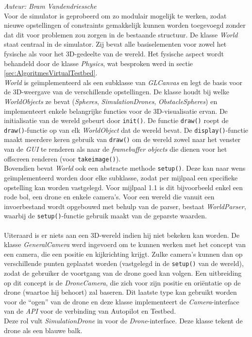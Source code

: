 {\em Auteur: Bram Vandendriessche}
\\

\noindent
Voor de simulator is geprobeerd om zo modulair mogelijk te werken, zodat nieuwe opstellingen of constraints gemakkelijk kunnen worden toegevoegd zonder dat dit voor problemen zou zorgen in de bestaande structuur. De klasse \textit{World} staat centraal in de simulator. Zij bevat alle basiselementen voor zowel het fysische als voor het 3D-gedeelte van de wereld. Het fysische aspect wordt behandeld door de klasse \textit{Physics}, wat besproken werd in sectie \ref{sec:AlgoritmesVirtualTestbed}. 
\\

\noindent
\textit{World} is ge\"implementeerd als een subklasse van \textit{GLCanvas} en legt de basis voor de 3D-weergave van de verschillende opstellingen. 
De klasse houdt bij welke \textit{WorldObjects} ze bevat (\textit{Spheres}, \textit{SimulationDrones}, \textit{ObstacleSpheres}) en implementeert enkele belangrijke functies voor de 3D-visualisatie ervan. De initialisatie van de wereld gebeurt door \texttt{init()}. De functie \texttt{draw()} roept de \texttt{draw()}-functie op van elk \textit{WorldObject} dat de wereld bevat. De \texttt{display()}-functie maakt meerdere keren gebruik van \texttt{draw()} om de wereld zowel naar het venster van de \textit{GUI} te renderen als naar de \textit{framebuffer objects} die dienen voor het offscreen renderen (voor \texttt{takeimage()}).\\
Bovendien bevat \textit{World} ook een abstracte methode \texttt{setup()}. Deze kan naar wens ge\"implementeerd worden door elke subklasse, zodat per mijlpaal een specifieke opstelling kan worden vastgelegd. Voor mijlpaal 1.1 is dit bijvoorbeeld enkel een rode bol, een drone en enkele camera's. Voor een wereld die vanuit een invoerbestand wordt opgebouwd met behulp van de parser, bestaat \textit{WorldParser}, waarbij de \texttt{setup()}-functie gebruik maakt van de geparste waarden.\\
\\
Uiteraard is er niets aan een 3D-wereld indien hij niet bekeken kan worden. De klasse \textit{GeneralCamera} werd ingevoerd om te kunnen werken met het concept van een camera, die een positie en kijkrichting krijgt. Zulke camera's kunnen dan op verschillende punten geplaatst worden (vastgelegd in de \texttt{setup()} van de wereld), zodat de gebruiker de voortgang van de drone goed kan volgen. Een uitbreiding op dit concept is de \textit{DroneCamera}, die zich voor zijn positie en ori\"entatie op de drone (waartoe hij behoort) zal baseren. Dit laatste type kan gebruikt worden voor de ``ogen'' van de drone en deze klasse implementeert de \textit{Camera}-interface van de \textit{API} voor de verbinding van Autopilot en Testbed.\\
Deze rol vult \textit{SimulationDrone} in voor de \textit{Drone}-interface. Deze klasse tekent de drone als een blauwe balk.

